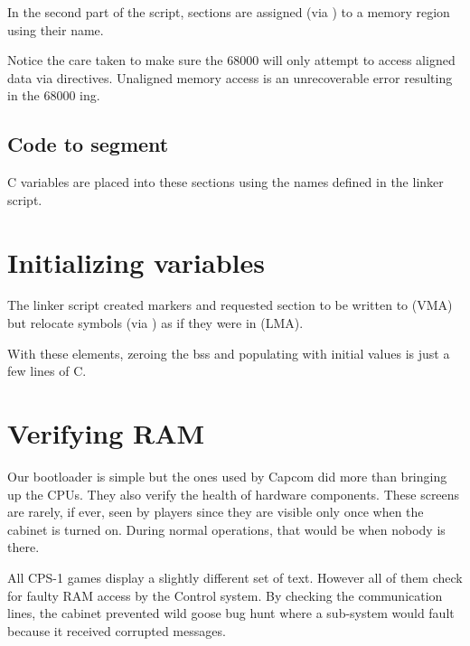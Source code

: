 

In the second part of the script, sections are assigned (via \textbf{\red{\textgreater}}) to a memory region using their  name.

\begin{trivia}
Notice the care taken to make sure the 68000 will only attempt to access aligned data via  directives. Unaligned memory access is an unrecoverable error resulting in the 68000 ing.
\end{trivia}


\subsection{Code to segment}

C variables are placed into these sections using the names defined in the linker script.





\section{Initializing variables}
The linker script created markers and requested section  to be written to  (VMA) but relocate symbols (via \textbf{}) as if they were in  (LMA).

With these elements, zeroing the bss and populating  with initial values is just a few lines of C.



\pagebreak
\section{Verifying RAM}
Our bootloader is simple but the ones used by Capcom did more than bringing up the CPUs. They also verify the health of hardware components. These screens are rarely, if ever, seen by players since they are visible only once when the cabinet is turned on. During normal operations, that would be when nobody is there.

All CPS-1 games display a slightly different set of text. However all of them check for faulty RAM access by the Control system. By checking the communication lines, the cabinet prevented wild goose bug hunt where a sub-system would fault because it received corrupted messages. 

